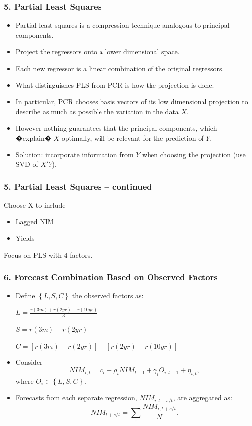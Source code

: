 \documentclass[handout]{beamer}
\begin{document}
\begin{frame}

\frametitle{5. Partial Least Squares}

\begin{itemize}
\item Partial least squares is a compression technique analogous to principal components.
\item Project the regressors onto a lower dimensional space.
\item Each new regressor is a linear combination of the original regressors.
\item What distinguishes PLS from PCR is how the
projection is done.
\item In particular, PCR chooses basis vectors of its low
dimensional projection to describe as much as
possible the variation in the data $X$.
\item However nothing guarantees that the principal
components, which �explain� $X$ optimally, will be
relevant for the prediction of $Y$.
\item Solution: incorporate information from $Y$ when
choosing the projection (use SVD of $X'Y$).

\end{itemize}
\end{frame}

\begin{frame}
\frametitle{5. Partial Least Squares -- continued}

Choose X to include
\begin{itemize}
\item Lagged NIM
\item Yields
\end{itemize}

Focus on PLS with 4 factors.

\end{frame}

\begin{frame}
\frametitle{6. Forecast Combination Based on Observed Factors }

\begin{itemize}
\item Define $\left\{
L,S,C\right\}$ the observed factors as:

$L = \frac{r(3m) + r(2yr) + r(10yr)}{3}$

$S = r(3m)-r(2yr)$

$C = \left[ r(3m)-r(2yr) \right] - \left[ r(2yr)-r(10yr) \right]$

\item Consider
\begin{equation*}
NIM_{i,t}=c_{i}+\rho _{i}NIM_{t-1}+\gamma _{i}O_{i,t-1}+{\eta _{i,t},}
\end{equation*}%
where $O_{i}\in \left\{ L,S,C\right\} .$

\item Forecasts  from each separate
regression, $NIM_{i,t+s/t}$, are aggregated as:
\begin{equation*}
NIM_{t+s/t}=\sum_{\tau }\frac{NIM_{i,t+s/t}}{N}.
\end{equation*}%

\end{itemize}
\end{frame}
\end{document}
